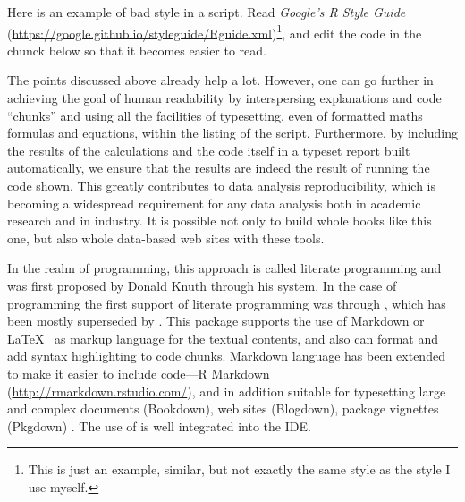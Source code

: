 \documentclass[krantz2]{krantz}\usepackage{knitr}%
\newcommand{\href}[2]{\emph{#2} (\url{#1})}
\begin{document}
\begin{playground}
Here is an example of bad style in a script. Read \href{https://google.github.io/styleguide/Rguide.xml}{Google's R Style Guide}\footnote{This is just an example, similar, but not exactly the same style as the style I use myself.}, and edit the code in the chunck below so that it becomes easier to read.

\begin{knitrout}\footnotesize
{}\color{fgcolor}\begin{kframe}
\begin{alltt}
 \hlkwb{<-}  
 \hlkwb{<-}  
 \hlkwb{<-}
     \hlopt{*}
 \hlkwb{->} 
      \hlstd{(}
\hlstd{)}
\end{alltt}
\end{kframe}
\end{knitrout}
\end{playground}

The points discussed above already help a lot. However, one can go further in achieving the goal of human readability by interspersing explanations and code ``chunks'' and using all the facilities of typesetting, even of formatted maths formulas and equations, within the listing of the script. Furthermore, by including the results of the calculations and the code itself in a typeset report built automatically, we ensure that the results are indeed the result of running the code shown. This greatly contributes to data analysis reproducibility, which is becoming a widespread requirement for any data analysis both in academic research and in industry. It is possible not only to build whole books like this one, but also whole data-based web sites with these tools.

In the realm of programming, this approach is called literate programming and was first proposed by Donald Knuth \autocite{Knuth1984a} through his  system. In the case of \Rpgrm programming the first support of literate programming was through , which has been mostly superseded by  \autocite{Xie2013}. This package supports the use of Markdown or \LaTeX\ \autocite{Lamport1994} as markup language for the textual contents, and also can format and add syntax highlighting to code chunks. Markdown language has been extended to make it easier to include \Rlang code---R Markdown (\url{http://rmarkdown.rstudio.com/}), and in addition suitable for typesetting large and complex documents (Bookdown), web sites (Blogdown), package vignettes (Pkgdown) \autocite{Xie2016,Xie2018}. The use of  is well integrated into the \RStudio IDE.
\end{document}
